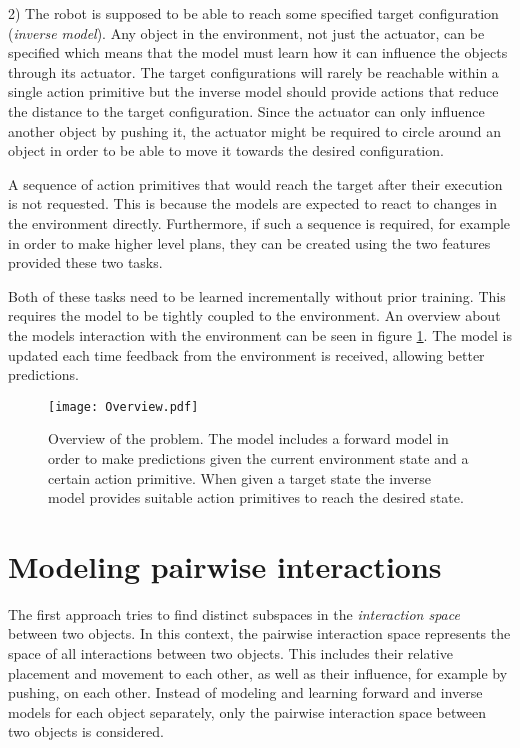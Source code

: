 2) The robot is supposed to be able to reach some specified target configuration (\textit{inverse model}). Any object in the environment, not just the actuator, can be specified which means that the model must learn how it can influence the objects through its actuator. The target configurations will rarely be reachable within a single action primitive but the inverse model should provide actions that reduce the distance to the target configuration. 
Since the actuator can only influence another object by pushing it, the actuator might be required to circle around an object in order to be able to move it towards the desired configuration.

A sequence of action primitives that would reach the target after their execution is not requested. This is because the models are expected to react to changes in the environment directly. Furthermore, if such a sequence is required, for example in order to make higher level plans, they can be created using the two features provided these two tasks.

Both of these tasks need to be learned incrementally without prior training. This requires the model to be tightly coupled to the environment. An overview about the models interaction with the environment can be seen in figure \ref{fig:overview}. The model is updated each time feedback from the environment is received, allowing better predictions.

\begin{figure}
	\centering
	\texttt{[image: Overview.pdf]}
	\caption{Overview of the problem. The model includes a forward model in order to make predictions given the current environment state and a certain action primitive. When given a target state the inverse model provides suitable action primitives to reach the desired state.}
	\label{fig:overview}
\end{figure}

\section{Modeling pairwise interactions \label{sec:pairInt}}
The first approach tries to find distinct subspaces in the \textit{interaction space} between two objects. In this context, the pairwise interaction space represents the space of all interactions between two objects. This includes their relative placement and movement to each other, as well as their influence, for example by pushing, on each other. Instead of modeling and learning forward and inverse models for each object separately, only the pairwise interaction space between two objects is considered. %

